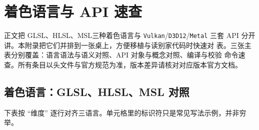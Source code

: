 \documentclass[12pt,a4paper,fontset=fandol]{ctexbook}
\newcommand{\Tp}[1]{\texttt{#1}}
\newcommand{\Bk}{\discretionary{}{}{}}
\newcommand{\Lang}[1]{\textsf{#1}}
\newcommand{\GSL}{\Lang{GLSL}}
\newcommand{\HSL}{\Lang{HLSL}}
\newcommand{\MSL}{\Lang{MSL}}
\begin{document}
\chapter{着色语言与 API 速查}
\label{ap:apB-shading-langs}

正文把 \GSL、\HSL、\MSL 三种着色语言与 \Tp{Vulkan}/{\Bk}\Tp{D3D12}/{\Bk}\Tp{Metal}
三套 API 分开讲。本附录把它们并排到一张桌上，方便移植与读别家代码时快速对
表。三张主表分别覆盖：语言语法与语义对照、API 对象与概念对照、编译与校验
命令速查。所有条目以头文件与官方规范为准，版本差异请核对对应版本官方文档。

\section{着色语言：GLSL、HLSL、MSL 对照}

下表按 ``维度'' 逐行对齐三语言。单元格里的标识符只是常见写法示例，并非穷举。
\end{document}
